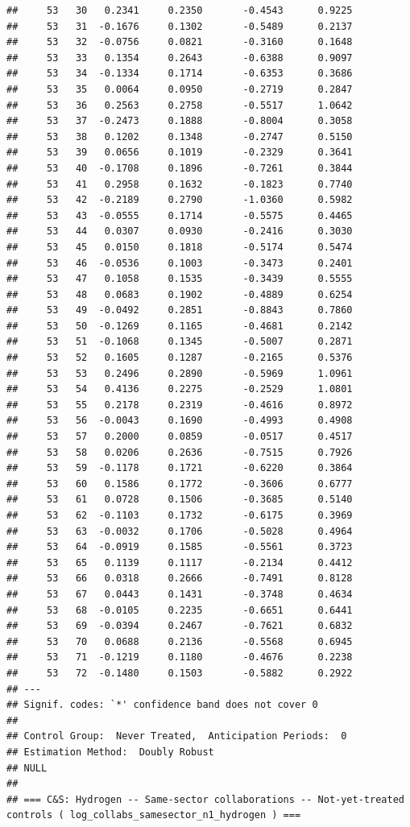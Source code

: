 \documentclass[
]{article}
\begin{document}
\begin{verbatim}
##     53   30   0.2341     0.2350       -0.4543      0.9225  
##     53   31  -0.1676     0.1302       -0.5489      0.2137  
##     53   32  -0.0756     0.0821       -0.3160      0.1648  
##     53   33   0.1354     0.2643       -0.6388      0.9097  
##     53   34  -0.1334     0.1714       -0.6353      0.3686  
##     53   35   0.0064     0.0950       -0.2719      0.2847  
##     53   36   0.2563     0.2758       -0.5517      1.0642  
##     53   37  -0.2473     0.1888       -0.8004      0.3058  
##     53   38   0.1202     0.1348       -0.2747      0.5150  
##     53   39   0.0656     0.1019       -0.2329      0.3641  
##     53   40  -0.1708     0.1896       -0.7261      0.3844  
##     53   41   0.2958     0.1632       -0.1823      0.7740  
##     53   42  -0.2189     0.2790       -1.0360      0.5982  
##     53   43  -0.0555     0.1714       -0.5575      0.4465  
##     53   44   0.0307     0.0930       -0.2416      0.3030  
##     53   45   0.0150     0.1818       -0.5174      0.5474  
##     53   46  -0.0536     0.1003       -0.3473      0.2401  
##     53   47   0.1058     0.1535       -0.3439      0.5555  
##     53   48   0.0683     0.1902       -0.4889      0.6254  
##     53   49  -0.0492     0.2851       -0.8843      0.7860  
##     53   50  -0.1269     0.1165       -0.4681      0.2142  
##     53   51  -0.1068     0.1345       -0.5007      0.2871  
##     53   52   0.1605     0.1287       -0.2165      0.5376  
##     53   53   0.2496     0.2890       -0.5969      1.0961  
##     53   54   0.4136     0.2275       -0.2529      1.0801  
##     53   55   0.2178     0.2319       -0.4616      0.8972  
##     53   56  -0.0043     0.1690       -0.4993      0.4908  
##     53   57   0.2000     0.0859       -0.0517      0.4517  
##     53   58   0.0206     0.2636       -0.7515      0.7926  
##     53   59  -0.1178     0.1721       -0.6220      0.3864  
##     53   60   0.1586     0.1772       -0.3606      0.6777  
##     53   61   0.0728     0.1506       -0.3685      0.5140  
##     53   62  -0.1103     0.1732       -0.6175      0.3969  
##     53   63  -0.0032     0.1706       -0.5028      0.4964  
##     53   64  -0.0919     0.1585       -0.5561      0.3723  
##     53   65   0.1139     0.1117       -0.2134      0.4412  
##     53   66   0.0318     0.2666       -0.7491      0.8128  
##     53   67   0.0443     0.1431       -0.3748      0.4634  
##     53   68  -0.0105     0.2235       -0.6651      0.6441  
##     53   69  -0.0394     0.2467       -0.7621      0.6832  
##     53   70   0.0688     0.2136       -0.5568      0.6945  
##     53   71  -0.1219     0.1180       -0.4676      0.2238  
##     53   72  -0.1480     0.1503       -0.5882      0.2922  
## ---
## Signif. codes: `*' confidence band does not cover 0
## 
## Control Group:  Never Treated,  Anticipation Periods:  0
## Estimation Method:  Doubly Robust
## NULL
## 
## === C&S: Hydrogen -- Same-sector collaborations -- Not-yet-treated controls ( log_collabs_samesector_n1_hydrogen ) ===
\end{verbatim}
\end{document}
